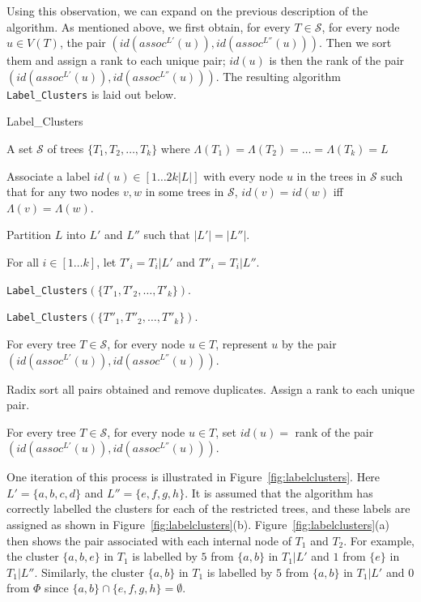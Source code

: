 \documentclass{article}
\newcommand{\leafset}{\Lambda}
\begin{document}
    Using this observation, we can expand on the previous description of the algorithm. As mentioned above, we first obtain, for every $T \in \mathcal{S}$, for every node $u \in V(T)$, the pair $(id(assoc^{L'}(u)), id(assoc^{L''}(u)))$. Then we sort them and assign a rank to each unique pair; $id(u)$ is then the rank of the pair $(id(assoc^{L'}(u)), id(assoc^{L''}(u)))$. The resulting algorithm \texttt{Label\_Clusters} is laid out below.

    \begin{algorithm}
        \caption{Label\_Clusters}
        \label{alg:labelclusters}

        \begin{algorithmic}[1]
            \Input A set $\mathcal{S}$ of trees $\{T_1, T_2, \dots, T_k\}$ where $\leafset(T_1) = \leafset(T_2) = \dots = \leafset(T_k) = L$

            \Output Associate a label $id(u) \in [1 \dots 2k |L|]$ with every node $u$ in the trees in $\mathcal{S}$ such that for any two nodes $v, w$ in some trees in $\mathcal{S}$, $id(v) = id(w)$ iff $\leafset(v) = \leafset(w)$.

            \State Partition $L$ into $L'$ and $L''$ such that $|L'| = |L''|$.

            \State For all $i \in [1 \dots k]$, let $T'_i = T_i|L'$ and $T''_i = T_i|L''$.

            \State \texttt{Label\_Clusters}$(\{T'_1, T'_2, \dots, T'_k\})$.

            \State \texttt{Label\_Clusters}$(\{T''_1, T''_2, \dots, T''_k\})$.

            \State For every tree $T \in \mathcal{S}$, for every node $u \in T$, represent $u$ by the pair $(id(assoc^{L'}(u)), id(assoc^{L''}(u)))$.

            \State Radix sort all pairs obtained and remove duplicates. Assign a rank to each unique pair.

            \State For every tree $T \in \mathcal{S}$, for every node $u \in T$, set $id(u) = $ rank of the pair $(id(assoc^{L'}(u)), id(assoc^{L''}(u)))$.
        \end{algorithmic}
    \end{algorithm}

    One iteration of this process is illustrated in Figure~\ref{fig:labelclusters}. Here $L' = \{a, b, c, d\}$ and $L'' = \{e, f, g, h\}$. It is assumed that the algorithm has correctly labelled the clusters for each of the restricted trees, and these labels are assigned as shown in Figure~\ref{fig:labelclusters}(b). Figure~\ref{fig:labelclusters}(a) then shows the pair associated with each internal node of $T_1$ and $T_2$. For example, the cluster $\{a, b, e\}$ in $T_1$ is labelled by $5$ from $\{a, b\}$ in $T_1|L'$ and $1$ from $\{e\}$ in $T_1|L''$. Similarly, the cluster $\{a, b\}$ in $T_1$ is labelled by $5$ from $\{a, b\}$ in $T_1|L'$ and $0$ from $\Phi$ since $\{a, b\} \cap \{e, f, g, h\} = \emptyset$.
\end{document}
